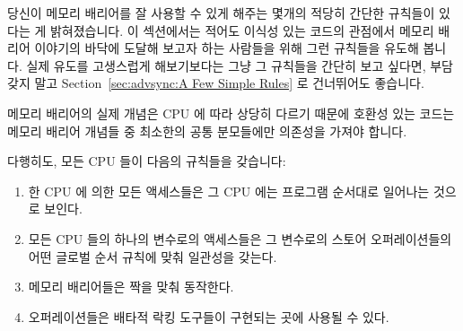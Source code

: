 당신이 메모리 배리어를 잘 사용할 수 있게 해주는 몇개의 적당히 간단한 규칙들이
있다는 게 밝혀졌습니다.
이 섹션에서는 적어도 이식성 있는 코드의 관점에서 메모리 배리어 이야기의 바닥에
도달해 보고자 하는 사람들을 위해 그런 규칙들을 유도해 봅니다.
실제 유도를 고생스럽게 해보기보다는 그냥 그 규칙들을 간단히 보고 싶다면, 부담
갖지 말고 Section~\ref{sec:advsync:A Few Simple Rules} 로 건너뛰어도 좋습니다.

메모리 배리어의 실제 개념은 CPU 에 따라 상당히 다르기 때문에 호환성 있는 코드는
메모리 배리어 개념들 중 최소한의 공통 분모들에만 의존성을 가져야 합니다.

다행히도, 모든 CPU 들이 다음의 규칙들을 갖습니다:
\begin{enumerate}
\item	한 CPU 에 의한 모든 액세스들은 그 CPU 에는 프로그램 순서대로 일어나는
	것으로 보인다.
\item	모든 CPU 들의 하나의 변수로의 액세스들은 그 변수로의 스토어
	오퍼레이션들의 어떤 글로벌 순서 규칙에 맞춰 일관성을 갖는다.
\item	메모리 배리어들은 짝을 맞춰 동작한다.
\item	오퍼레이션들은 배타적 락킹 도구들이 구현되는 곳에 사용될 수 있다.
\end{enumerate}


